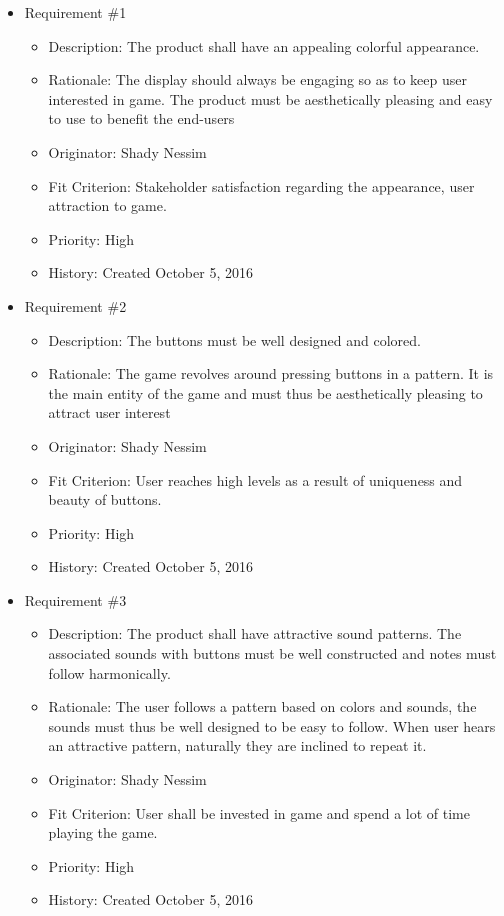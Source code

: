 \documentclass[12pt, titlepage]{article}
\begin{document}
\begin{itemize}

\item Requirement \#1 
\begin{itemize}
\item Description: The product shall have an appealing colorful appearance.
\item Rationale: The display should always be engaging so as to keep user interested in game. The product must be aesthetically pleasing and easy to use to beneﬁt the end-users
\item Originator: Shady Nessim 
\item Fit Criterion: Stakeholder satisfaction regarding the appearance, user attraction to game. 
\item Priority: High 
\item History: Created October 5, 2016 \\
\end{itemize}

\item Requirement \#2 
\begin{itemize} 
\item Description: The buttons must be well designed and colored.
\item Rationale: The game revolves around pressing buttons in a pattern. It is the main entity of the game and must thus be aesthetically pleasing to attract user interest
\item Originator: Shady Nessim 
\item Fit Criterion: User reaches high levels as a result of uniqueness and beauty of buttons. 
\item Priority: High 
\item History: Created October 5, 2016 \\
\end{itemize}

\item Requirement \#3 
\begin{itemize} 
\item Description: The product shall have attractive sound patterns. The associated sounds with buttons must be well constructed and notes must follow harmonically.
\item Rationale: The user follows a pattern based on colors and sounds, the sounds must thus be well designed to be easy to follow. When user hears an attractive pattern, naturally they are inclined to repeat it.
\item Originator: Shady Nessim 
\item Fit Criterion: User shall be invested in game and spend a lot of time playing the game. 
\item Priority: High 
\item History: Created October 5, 2016 \\
\end{itemize}

\end{itemize}
\end{document}
